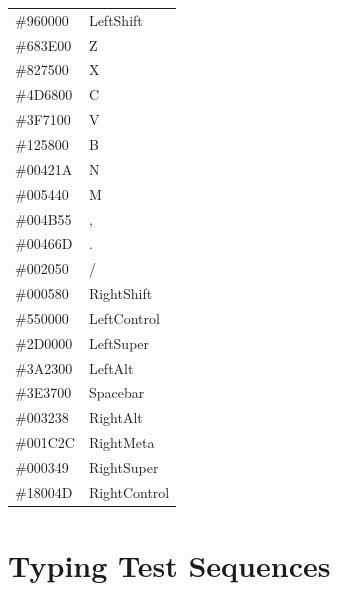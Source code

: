 \documentclass{report}
\begin{document}
\begin{supertabular}{ll}
	\#960000 & LeftShift         \\
	\#683E00 & Z								 \\
	\#827500 & X								 \\
	\#4D6800 & C								 \\
	\#3F7100 & V								 \\
	\#125800 & B								 \\
	\#00421A & N								 \\
	\#005440 & M								 \\
	\#004B55 & ,								 \\
	\#00466D & .								 \\
	\#002050 & /								 \\
	\#000580 & RightShift				 \\

	\#550000 & LeftControl       \\
	\#2D0000 & LeftSuper         \\
	\#3A2300 & LeftAlt           \\
	\#3E3700 & Spacebar					 \\
	\#003238 & RightAlt					 \\
	\#001C2C & RightMeta 				 \\
	\#000349 & RightSuper				 \\
	\#18004D & RightControl 		 \\
\end{supertabular}

\onecolumn
\chapter{Typing Test Sequences}
\label{appendix:test-sequences}
\end{document}
